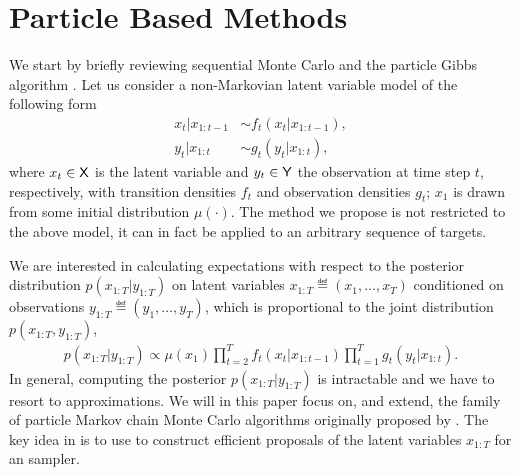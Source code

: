 
\section{Particle Based Methods}
\label{sec:inf:smc}


We start by briefly reviewing sequential Monte Carlo \citep{gordon1993novel,doucet2001sequential} and the particle Gibbs algorithm \citep{andrieuDH2010}. Let us consider a non-Markovian latent variable model of the following form
\begin{subequations}
	\label{eq:ssm}
	\begin{alignat}{2}
		x_t | x_{1:t-1} &\sim f_t(x_t | x_{1:t-1}), \\
		y_t | x_{1:t} &\sim g_t(y_t|x_{1:t}),
	\end{alignat}
\end{subequations}
where $x_t \in \mathsf{X}$ is the latent variable and $y_t \in \mathsf{Y}$ the observation at time step $t$, respectively,
with transition densities $f_t$ and observation densities $g_t$; $x_1$ is drawn from some initial distribution $\mu(\cdot)$. The method we propose is not restricted to the above model, it can in fact be applied to an arbitrary sequence of targets.


We are interested in calculating expectations with respect to the posterior distribution $p(x_{1:T}|y_{1:T})$ on latent variables $x_{1:T} \eqdef (x_1,\ldots,x_T)$ conditioned on observations $y_{1:T} \eqdef (y_1,\ldots,y_T)$, which is proportional to the joint distribution $p(x_{1:T}, y_{1:T})$,
\begin{align}
	\label{eq:jointdistribution}
	p(x_{1:T} | y_{1:T}) \propto  \mu(x_1) \prod_{t=2}^T f_t(x_t | x_{1:t-1}) \prod_{t=1}^T g_t(y_t|x_{1:t}).\nonumber
\end{align}
In general, computing the posterior $p(x_{1:T}|y_{1:T})$ is intractable and we have to resort to approximations. We will in this paper focus on, and extend, the family of particle Markov chain Monte Carlo algorithms originally proposed by \citet{andrieuDH2010}. The key idea in \pmcmc is to use \smc to construct efficient proposals of the latent variables $x_{1:T}$ for an \mcmc sampler.

